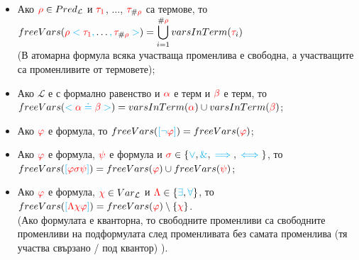\documentclass{article}[12pt]
\newcommand{\Lang}{\mathcal{L}}
\begin{document}
\begin{itemize}
\item Ако \(\color{red}\rho \color{black} \in Pred_\Lang\) и \(\color{red}\tau_1\), \(\dots\), \(\color{red}\tau_{\color{black}\#\color{red}\rho}\) са термове, то \\
\(freeVars(\color{red}\rho \color{cyan} < \color{red} \tau_1 \color{cyan} , \color{black} \dots \color{cyan} , \color{red} \tau_{\color{black}\#\color{red}\rho} \color{cyan} > \color{black}) = \displaystyle\bigcup_{i = 1}^{\color{black}\#\color{red}\rho \color{black}} varsInTerm(\color{red} \tau_{\color{black} i } \color{black} )\) \\
(В атомарна формула всяка участваща променлива е свободна, а участващите са променливите от термовете);
\item  Ако \(\Lang\) е с формално равенство и \(\color{red} \alpha\) е терм и \(\color{red} \beta\) е терм, то \\
\(freeVars(\color{cyan} < \color{red} \alpha \color{cyan} \doteq \color{red} \beta \color{cyan} > \color{black}) = varsInTerm(\color{red} \alpha \color{black}) \cup varsInTerm(\color{red} \beta \color{black})\);
\item Ако \(\color{red} \varphi\) е формула,
то \(freeVars(\color{cyan} [ \neg \color{red} \varphi \color{cyan} ] \color{black}) = freeVars(\color{red} \varphi \color{black})\);
\item Ако \(\color{red} \varphi\) е формула,
\(\color{red} \psi\) е формула и \(\color{red} \sigma \color{black} \in \{\color{cyan} \lor \color{black} , \color{cyan} \& \color{black} , \color{cyan}\implies \color{black} , \color{cyan}\iff \color{black} \}\), то \\
\(freeVars(\color{cyan} [ \color{red} \varphi \sigma \psi \color{cyan} ] \color{black}) = freeVars(\color{red} \varphi \color{black}) \cup freeVars(\color{red} \psi \color{black})\);
\item Ако \(\color{red} \varphi\) е формула, \(\color{red} \chi \color{black} \in Var_\Lang\) и \(\color{red} \Lambda \color{black} \in \{\color{cyan} \exists \color{black} , \color{cyan} \forall \color{black} \}\), то \\
\(freeVars(\color{cyan} [ \color{red} \Lambda \chi \varphi \color{cyan} ] \color{black}) = freeVars(\color{red} \varphi \color{black}) \setminus \{\color{red} \chi \color{black}\}\). \\
(Ако формулата е кванторна, то свободните променливи са свободните променливи на подформулата след променливата без самата променлива (тя участва свързано / под квантор) ).
\end{itemize}
\end{document}
